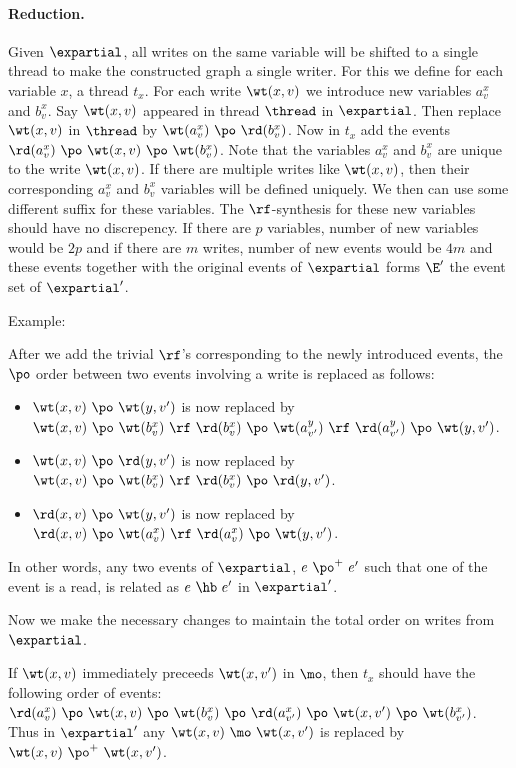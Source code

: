 \paragraph*{Reduction.} Given $\expartial$, all writes on the same variable will be shifted to a single thread to make the constructed graph a single writer. For this we define for each variable $x$, a thread $t_x$. For each write $\wt(x,v)$ we introduce new variables $a^x_v$ and $b^x_v$. Say  $\wt(x,v)$ appeared in thread $\thread$ in $\expartial$. Then replace $\wt(x,v)$ in $\thread$ by $\wt(a^x_v)~\po~\rd(b^x_v)$. Now in $t_x$ add the events $\rd(a^x_v)~\po~\wt(x,v)~\po~\wt(b^x_v)$. Note that the variables $a^x_v$ and $b^x_v$ are unique to the write $\wt(x,v)$. If there are multiple writes like $\wt(x,v)$, then their corresponding $a^x_v$ and $b^x_v$ variables will be defined uniquely. We then can use some different suffix for these variables. The $\rf$-synthesis for these new variables should have no  discrepency. If there are $p$ variables, number of new variables would be $2p$ and if there are $m$ writes, number of new events would be $4m$ and these events together with the original events of $\expartial$ forms $\E'$ the event set of $\expartial'$. 

Example: 

After we add the trivial $\rf$'s corresponding to the newly introduced events, the $\po$ order between two events involving a write is replaced as follows:
\begin{itemize}
 \item $\wt(x,v)~\po~\wt(y,v')$ is now replaced by $\wt(x,v)~\po~\wt(b^x_v)~\rf~\rd(b^x_v)~\po~\wt(a^y_{v'})~\rf~\rd(a^y_{v'})~\po~\wt(y,v')$.
 \item $\wt(x,v)~\po~\rd(y,v')$ is now replaced by $\wt(x,v)~\po~\wt(b^x_v)~\rf~\rd(b^x_v)~\po~\rd(y,v')$.
 \item $\rd(x,v)~\po~\wt(y,v')$ is now replaced by $\rd(x,v)~\po~\wt(a^x_v)~\rf~\rd(a^x_v)~\po~\wt(y,v')$.
 
\end{itemize}
In other words, any two events of $\expartial$,  $e~\po^+~e'$ such that one of the event is a read, is related as  $e~\hb~e'$ in $\expartial'$.

Now we make the necessary  changes to maintain the total order on writes from $\expartial$. 

If $\wt(x,v)$ immediately preceeds $\wt(x,v')$ in $\mo$, then $t_x$ should have the following order of events: $\rd(a^x_v)~\po~\wt(x,v)~\po~\wt(b^x_v)~\po~\rd(a^x_{v'})~\po~\wt(x,v')~\po~\wt(b^x_{v'})$. Thus in $\expartial'$ any $\wt(x,v)~\mo~\wt(x,v')$ is replaced by $\wt(x,v)~\po^{+} ~\wt(x,v')$. 

